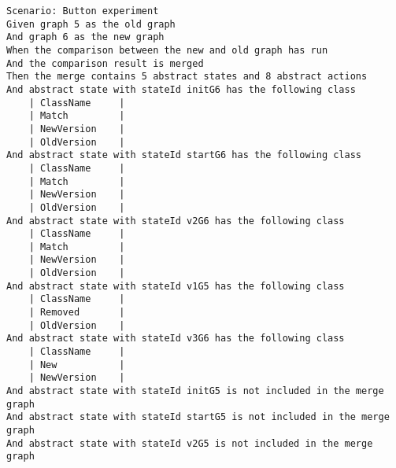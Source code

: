 \begin{lstlisting}[language=Gherkin, caption=Test Scenario's, label=code:gherkin-tests]
Scenario: Button experiment 
Given graph 5 as the old graph
And graph 6 as the new graph
When the comparison between the new and old graph has run
And the comparison result is merged
Then the merge contains 5 abstract states and 8 abstract actions
And abstract state with stateId initG6 has the following class
    | ClassName     |
    | Match         |
    | NewVersion    |
    | OldVersion    |
And abstract state with stateId startG6 has the following class
    | ClassName     |
    | Match         |
    | NewVersion    |
    | OldVersion    |
And abstract state with stateId v2G6 has the following class
    | ClassName     |
    | Match         |
    | NewVersion    |
    | OldVersion    |
And abstract state with stateId v1G5 has the following class
    | ClassName     |
    | Removed       |
    | OldVersion    |
And abstract state with stateId v3G6 has the following class
    | ClassName     |
    | New           |
    | NewVersion    |
And abstract state with stateId initG5 is not included in the merge graph
And abstract state with stateId startG5 is not included in the merge graph
And abstract state with stateId v2G5 is not included in the merge graph
\end{lstlisting}